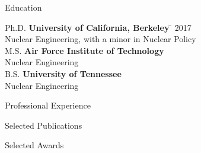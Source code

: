 \documentclass{resume3} %
\begin{document}

\begin{rSection}{Education}

\begin{tabbing}
Ph.D. \hspace*{2 em}\= \textbf{University of California, Berkeley} \hspace*{5em} \= \hspace*{15em} \= 2017 \\
      \> Nuclear Engineering, with a minor in Nuclear Policy \\
%
M.S. \hspace*{2 em}\> \textbf{Air Force Institute of Technology} \>  \\
      \> Nuclear Engineering\\
%
B.S. \hspace*{2 em}\> \textbf{University of Tennessee} \>  \\
      \> Nuclear Engineering
\end{tabbing}
\end{rSection}

\begin{rSection}{Professional Experience}

\end{rSection}

\begin{rSection}{Selected Publications}

\end{rSection}

\vspace*{0.5em}
\begin{rSection}{Selected Awards}

\end{rSection}

\vspace*{0.5em}
%

\end{document}
